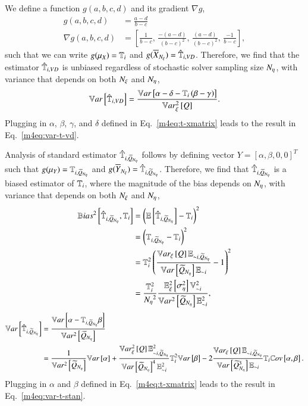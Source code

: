 We define a function $g(a,b,c,d)$ and its gradient $\nabla g$,
\begin{align}
    g (a,b,c,d) &= \frac{a-d}{b - c} \\
    \nabla g (a,b,c,d) &= \left[ \frac{1}{b-c}, \, \frac{-(a-d)}{(b-c)^2}, \, \frac{(a-d)}{(b-c)^2}, \, \frac{-1}{b-c} \right] ,
\end{align}
such that we can write $g(\mu_X) = \T{i}$ and $g(\xavg) = \unpollTsalt{i}$.
%
Therefore, we find that the estimator $\unpollTsalt{i}$ is unbiased regardless of stochastic solver sampling size $\Neta$, with variance that depends on both $\Nxi$ and $\Neta$,
\begin{equation}
    \Var{\unpollTsalt{i}} = \frac{\Var{\alpha - \delta - \T{i} \left( \beta - \gamma \right)}}{\Vxisq{Q}} .
\end{equation}
Plugging in $\alpha$, $\beta$, $\gamma$, and $\delta$ defined in Eq.~\eqref{m4eq:t-xmatrix} leads to the result in Eq.~\ref{m4eq:var-t-vd}.

Analysis of standard estimator $\pollTsalt{i}$ follows by defining vector $Y = \left[ \alpha, \beta, 0, 0 \right]^T$ such that $g(\mu_Y) = \Tpoll{i}$ and $g(\yavg) = \pollTsalt{i}$. 
%
Therefore, we find that $\pollTsalt{i}$ is a biased estimator of $\T{i}$, where the magnitude of the bias depends on $\Neta$, with variance that depends on both $\Nxi$ and $\Neta$,
\begin{align}
    \bias{\pollTsalt{i}, \T{i}} &= \left( \EE{\pollTsalt{i}} - \T{i} \right)^2 \\
    &= \left( \Tpoll{i} - \T{i} \right)^2 \\
    &= \T{i}^2 \left( \frac{\Vxi{Q}\pollE{\ni}}{\Var{\Qpoll}\E{\ni}} - 1 \right)^2 \\
    &= \frac{\T{i}^2}{\Neta^2} \frac{\EExisq{\Sigsqeta} \V{\ni}^2}{\Vsq{\Qpoll} \E{\ni}^2} ,
\end{align}
\begin{align}
        \Var{\pollTsalt{i}} &= \frac{\Var{\alpha - \Tpoll{i}\beta}}{\Vsq{\Qpoll}} \\
        &= \frac{1}{\Vsq{\Qpoll}}\Var{\alpha} + \frac{\Vxisq{Q} \pollE{\ni}^2 }{\Var{\Qpoll}^4 \E{\ni}^2}\T{i}^2 \Var{\beta} - 2 \frac{\Vxi{Q} \pollE{\ni}}{\Var{\Qpoll^3}\E{\ni}} \T{i} \Cov{\alpha}{\beta} .
\end{align}
Plugging in $\alpha$ and $\beta$ defined in Eq.~\eqref{m4eq:t-xmatrix} leads to the result in Eq.~\ref{m4eq:var-t-stan}.


